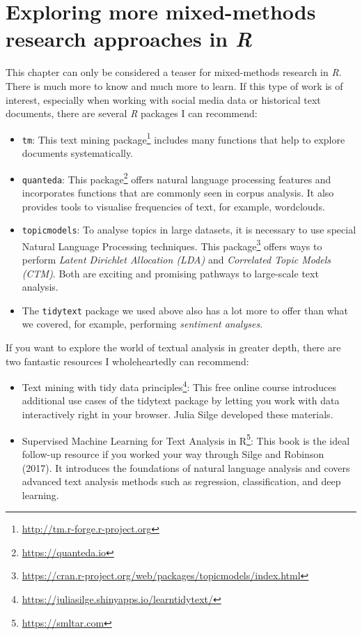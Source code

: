 \documentclass[
  letterpaper,
]{krantz}
\renewcommand{\href}[2]{#2\footnote{\url{#1}}}
\begin{document}
\section{\texorpdfstring{Exploring more mixed-methods research
approaches in
\emph{R}}{Exploring more mixed-methods research approaches in R}}\label{exploring-more-mixed-methods-research-approaches-in-r}

This chapter can only be considered a teaser for mixed-methods research
in \emph{R}. There is much more to know and much more to learn. If this
type of work is of interest, especially when working with social media
data or historical text documents, there are several \emph{R} packages I
can recommend:

\begin{itemize}
\item
  \texttt{tm}: This \href{http://tm.r-forge.r-project.org}{text mining
  package} includes many functions that help to explore documents
  systematically.
\item
  \texttt{quanteda}: This \href{https://quanteda.io}{package} offers
  natural language processing features and incorporates functions that
  are commonly seen in corpus analysis. It also provides tools to
  visualise frequencies of text, for example, wordclouds.
\item
  \texttt{topicmodels}: To analyse topics in large datasets, it is
  necessary to use special Natural Language Processing techniques. This
  \href{https://cran.r-project.org/web/packages/topicmodels/index.html}{package}
  offers ways to perform \emph{Latent Dirichlet Allocation (LDA)} and
  \emph{Correlated Topic Models (CTM)}. Both are exciting and promising
  pathways to large-scale text analysis.
\item
  The \texttt{tidytext} package we used above also has a lot more to
  offer than what we covered, for example, performing \emph{sentiment
  analyses}.
\end{itemize}

If you want to explore the world of textual analysis in greater depth,
there are two fantastic resources I wholeheartedly can recommend:

\begin{itemize}
\item
  \href{https://juliasilge.shinyapps.io/learntidytext/}{Text mining with
  tidy data principles}: This free online course introduces additional
  use cases of the tidytext package by letting you work with data
  interactively right in your browser. Julia Silge developed these
  materials.
\item
  \href{https://smltar.com}{Supervised Machine Learning for Text
  Analysis in R}: This book is the ideal follow-up resource if you
  worked your way through Silge and Robinson (2017). It introduces the
  foundations of natural language analysis and covers advanced text
  analysis methods such as regression, classification, and deep
  learning.
\end{itemize}
\end{document}
